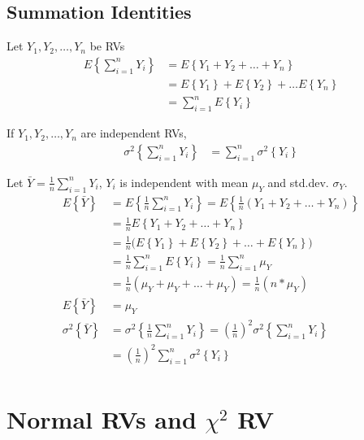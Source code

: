 \documentclass[10pt]{article}
\newcommand{\mean}[1]{\mu_{#1}}
\renewcommand{\exp}[1]{E\left\{#1\right\}} %
\newcommand{\var}[1]{\sigma^2\left\{#1\right\}}
\newcommand{\subdev}[1]{\sigma_{#1}}
\begin{document}
\begin{multicols}{3}
    \subsection{Summation Identities}

    Let $Y_1, Y_2, \dots, Y_n$ be RVs
    \begin{align*}
        \exp{\sum^n_{i=1} Y_i} & = \exp{Y_1 + Y_2 + \dots + Y_n}           \\
                               & = \exp{Y_1} + \exp{Y_2} + \dots \exp{Y_n} \\
                               & = \sum^n_{i=1} \exp{Y_i}
    \end{align*}

    If $Y_1, Y_2, \dots, Y_n$ are independent RVs,
    \begin{align*}
        \var{\sum^n_{i=1} Y_i} & = \sum^n_{i=1} \var{Y_i}
    \end{align*}

    Let $\bar Y = \frac{1}{n} \sum^n_{i=1} Y_i$, $Y_i$ is independent with mean $\mean{Y}$ and std.dev. $\subdev{Y}$.
    \begin{align*}
        \exp{\bar Y}    & = \exp{\frac{1}{n} \sum^n_{i=1} Y_i} = \exp{\frac{1}{n} (Y_1 + Y_2 + \dots + Y_n)}       \\
                        & = \frac{1}{n} \exp{Y_1 + Y_2 + \dots + Y_n}                                              \\
                        & = \frac{1}{n} \Big(\exp{Y_1} + \exp{Y_2} + \dots + \exp{Y_n}\Big)                        \\
                        & = \frac{1}{n} \sum^n_{i=1} \exp{Y_i} = \frac{1}{n} \sum^n_{i=1} \mean{Y}                 \\
                        & = \frac{1}{n} (\mean{Y} + \mean{Y} + \dots + \mean{Y}) = \frac{1}{n} (n*\mean{Y})        \\
        \exp{\bar Y}    & = \mean{Y}                                                                               \\
        \var{\bar Y} & = \var{\frac{1}{n} \sum^n_{i=1} Y_i} = \left(\frac{1}{n}\right)^2 \var{\sum^n_{i=1} Y_i} \\
                        & = \left(\frac{1}{n}\right)^2 \sum^n_{i=1} \var{Y_i}                                      \\
    \end{align*}

    \section{Normal RVs and \texorpdfstring{$\chi^2$}{X2} RV} %


\end{multicols}
\end{document}
